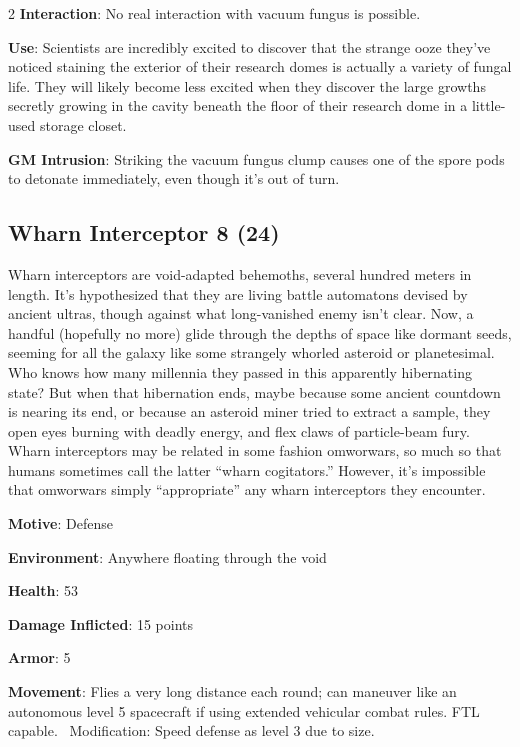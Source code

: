 \begin{multicols}{2}
\textbf{Interaction}: No real interaction with vacuum fungus is possible. 

\textbf{Use}: Scientists are incredibly excited to discover that the strange ooze they’ve noticed staining the exterior of their research domes is actually a variety of fungal life. They will likely become less excited when they discover the large growths secretly growing in the cavity beneath the floor of their research dome in a little-used storage closet.

\textbf{GM Intrusion}: Striking the vacuum fungus clump causes one of the spore pods to detonate immediately, even though it’s out of turn.

\subsection{Wharn Interceptor 8 (24)}

Wharn interceptors are void-adapted behemoths, several hundred meters in length. It’s hypothesized that they are living battle automatons devised by ancient ultras, though against what long-vanished enemy isn’t clear. Now, a handful (hopefully no more) glide through the depths of space like dormant seeds, seeming for all the galaxy like some strangely whorled asteroid or planetesimal. Who knows how many millennia they passed in this apparently hibernating state? But when that hibernation ends, maybe because some ancient countdown is nearing its end, or because an asteroid miner tried to extract a sample, they open eyes burning with deadly energy, and flex claws of particle-beam fury. 
Wharn interceptors may be related in some fashion omworwars, so much so that humans sometimes call the latter “wharn cogitators.” However, it’s impossible that omworwars simply “appropriate” any wharn interceptors they encounter. 

\textbf{Motive}: Defense 

\textbf{Environment}: Anywhere floating through the void 

\textbf{Health}: 53 

\textbf{Damage Inflicted}: 15 points 

\textbf{Armor}: 5 

\textbf{Movement}: Flies a very long distance each round; can maneuver like an autonomous level 5 spacecraft if using extended vehicular combat rules. FTL capable. 
Modification: Speed defense as level 3 due to size. 


\end{multicols}
